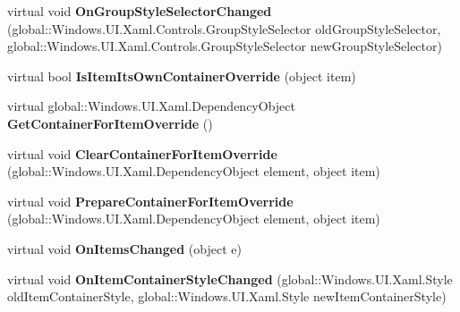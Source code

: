 \begin{DoxyCompactItemize}
virtual void {\bfseries On\+Group\+Style\+Selector\+Changed} (global\+::\+Windows.\+U\+I.\+Xaml.\+Controls.\+Group\+Style\+Selector old\+Group\+Style\+Selector, global\+::\+Windows.\+U\+I.\+Xaml.\+Controls.\+Group\+Style\+Selector new\+Group\+Style\+Selector)
\item 
\mbox{\label{class_windows_1_1_u_i_1_1_xaml_1_1_controls_1_1_items_control_af7c44086f992202e12f3559064216061}} 
virtual bool {\bfseries Is\+Item\+Its\+Own\+Container\+Override} (object item)
\item 
\mbox{\label{class_windows_1_1_u_i_1_1_xaml_1_1_controls_1_1_items_control_a77205f1b95f23b7eac70cb06025fade2}} 
virtual global\+::\+Windows.\+U\+I.\+Xaml.\+Dependency\+Object {\bfseries Get\+Container\+For\+Item\+Override} ()
\item 
\mbox{\label{class_windows_1_1_u_i_1_1_xaml_1_1_controls_1_1_items_control_af3c1217d5a48fec76e474ba4bf48a67a}} 
virtual void {\bfseries Clear\+Container\+For\+Item\+Override} (global\+::\+Windows.\+U\+I.\+Xaml.\+Dependency\+Object element, object item)
\item 
\mbox{\label{class_windows_1_1_u_i_1_1_xaml_1_1_controls_1_1_items_control_ab41bdb021d690e9fd35d99c8455e58cf}} 
virtual void {\bfseries Prepare\+Container\+For\+Item\+Override} (global\+::\+Windows.\+U\+I.\+Xaml.\+Dependency\+Object element, object item)
\item 
\mbox{\label{class_windows_1_1_u_i_1_1_xaml_1_1_controls_1_1_items_control_af4965a6cf05198973920cd4d95c82dbc}} 
virtual void {\bfseries On\+Items\+Changed} (object e)
\item 
\mbox{\label{class_windows_1_1_u_i_1_1_xaml_1_1_controls_1_1_items_control_a6621d703e5349274aade1e24d36daf58}} 
virtual void {\bfseries On\+Item\+Container\+Style\+Changed} (global\+::\+Windows.\+U\+I.\+Xaml.\+Style old\+Item\+Container\+Style, global\+::\+Windows.\+U\+I.\+Xaml.\+Style new\+Item\+Container\+Style)

\end{DoxyCompactItemize}
